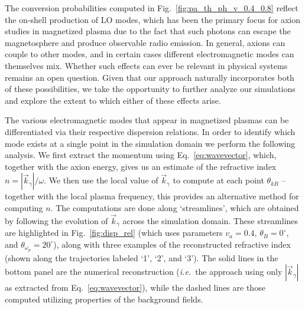 \documentclass[twocolumn,superscriptaddress,floatfix,preprintnumbers,prd,nofootinbib,aps,10pt]{revtex4-2}
\renewcommand\({\left(}
\renewcommand\){\right)}
\renewcommand\[{\left[}
\renewcommand\]{\right]}
\newcommand\ie{{\it i.e.}~}
\begin{document}



The conversion probabilities computed in Fig.~\ref{fig:pa_th_ph_v_0.4_0.8} reflect the on-shell production of LO modes, which has been the primary focus for axion studies in magnetized plasma due to the fact that such photons can escape the magnetosphere and produce observable radio emission. In general, axions can couple to other modes, and in certain cases different electromagnetic modes can themselves mix. Whether such effects can ever be relevant in physical systems remains an open question. Given that our approach naturally incorporates both of these possibilities, we take the opportunity to further analyze our simulations and explore the extent to which either of these effects arise.

The various electromagnetic modes that appear in magnetized plasmas can be differentiated via their respective dispersion relations. In order to identify which mode exists at a single point in the simulation domain we perform the following analysis. We first extract the momentum using Eq.~\ref{eq:wavevector}, which, together with the axion energy, gives us an estimate of the refractive index $n = |\vec{k}_\gamma| / \omega$. We then use the local value of $\vec{k}_\gamma$ to compute at each point $\theta_{kB}$ -- together with the local plasma frequency, this provides an alternative method for computing $n$. The computations are done along `streamlines', which are obtained by following the evolution of $\vec{k}_\gamma$ across the simulation domain. These streamlines are highlighted in Fig.~\ref{fig:disp_rel} (which uses parameters $v_a = 0.4$, $\theta_{B} = 0^\circ$, and $\theta_{\omega_p} = 20^\circ$), along with three examples of the reconstructed refractive index (shown along the trajectories labeled `1', `2', and `3'). The solid lines in the bottom panel are the numerical reconstruction (\ie the approach using only $|\vec{k}_\gamma|$ as extracted from Eq.~\ref{eq:wavevector}), while the dashed lines are those computed utilizing properties of the background fields.
\end{document}
